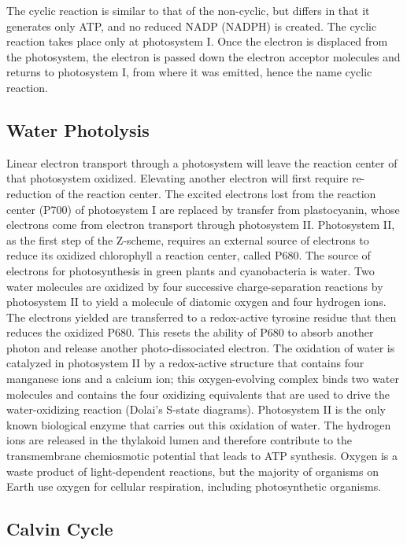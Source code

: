 The cyclic reaction is similar to that of the non-cyclic, but differs in that it generates only ATP, and no reduced NADP (NADPH) is created. The cyclic reaction takes place only at photosystem I. Once the electron is displaced from the photosystem, the electron is passed down the electron acceptor molecules and returns to photosystem I, from where it was emitted, hence the name cyclic reaction.

\hypertarget{water-photolysis}{%
\subsection{Water Photolysis}\label{water-photolysis}}

Linear electron transport through a photosystem will leave the reaction center of that photosystem oxidized. Elevating another electron will first require re-reduction of the reaction center. The excited electrons lost from the reaction center (P700) of photosystem I are replaced by transfer from plastocyanin, whose electrons come from electron transport through photosystem II. Photosystem II, as the first step of the Z-scheme, requires an external source of electrons to reduce its oxidized chlorophyll a reaction center, called P680. The source of electrons for photosynthesis in green plants and cyanobacteria is water. Two water molecules are oxidized by four successive charge-separation reactions by photosystem II to yield a molecule of diatomic oxygen and four hydrogen ions. The electrons yielded are transferred to a redox-active tyrosine residue that then reduces the oxidized P680. This resets the ability of P680 to absorb another photon and release another photo-dissociated electron. The oxidation of water is catalyzed in photosystem II by a redox-active structure that contains four manganese ions and a calcium ion; this oxygen-evolving complex binds two water molecules and contains the four oxidizing equivalents that are used to drive the water-oxidizing reaction (Dolai's S-state diagrams). Photosystem II is the only known biological enzyme that carries out this oxidation of water. The hydrogen ions are released in the thylakoid lumen and therefore contribute to the transmembrane chemiosmotic potential that leads to ATP synthesis. Oxygen is a waste product of light-dependent reactions, but the majority of organisms on Earth use oxygen for cellular respiration, including photosynthetic organisms.

\hypertarget{calvin-cycle}{%
\subsection{Calvin Cycle}\label{calvin-cycle}}

